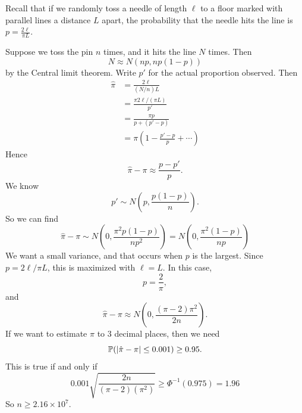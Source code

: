 \documentclass[a4paper]{article}
\begin{document}
\begin{eg}
  Recall that if we randomly toss a needle of length $\ell$ to a floor marked with parallel lines a distance $L$ apart, the probability that the needle hits the line is $p = \frac{2\ell}{\pi L}$.
  \begin{center}
  \end{center}
  Suppose we toss the pin $n$ times, and it hits the line $N$ times. Then
  \[
    N\approx N(np, np(1 - p))
  \]
  by the Central limit theorem. Write $p'$ for the actual proportion observed. Then
  \begin{align*}
    \hat{\pi} &= \frac{2\ell}{(N/n) L} \\
    &= \frac{\pi 2\ell/(\pi L)}{p'}\\
    &= \frac{\pi p}{p + (p' - p)}\\
    &= \pi \left(1 - \frac{p' - p}{p} + \dotsb \right)
  \end{align*}
  Hence
  \[
    \hat\pi - \pi \approx \frac{p - p'}{p}.
  \]
  We know
  \[
    p' \sim N\left(p, \frac{p(1 - p)}{n}\right).
  \]
  So we can find
  \[
    \hat \pi - \pi \sim N\left(0, \frac{\pi^2 p(1 - p)}{np^2}\right) = N\left(0, \frac{\pi^2(1 - p)}{np}\right)
  \]
  We want a small variance, and that occurs when $p$ is the largest. Since $p = 2\ell/\pi L$, this is maximized with $\ell = L$. In this case,
  \[
    p = \frac{2}{\pi},
  \]
  and
  \[
    \hat \pi - \pi \approx N\left(0, \frac{(\pi - 2)\pi^2}{2n}\right).
  \]
  If we want to estimate $\pi$ to 3 decimal places, then we need
  \[
    \P(|\hat \pi - \pi| \leq 0.001) \geq 0.95.
  \]
  This is true if and only if
  \[
    0.001\sqrt{\frac{2n}{(\pi - 2)(\pi^2)}} \geq \Phi^{-1}(0.975) = 1.96
  \]
  So $n\geq 2.16 \times 10^7$.
\end{eg}
\end{document}
